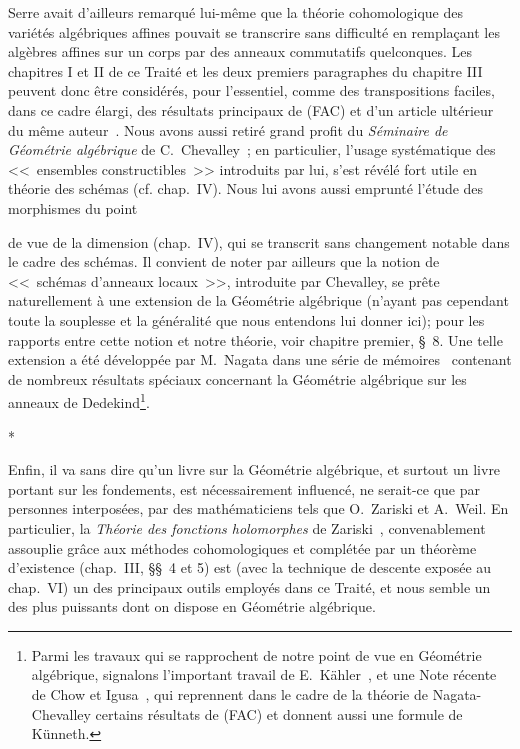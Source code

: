 Serre avait d'ailleurs remarqué lui-même que la théorie cohomologique des variétés algébriques affines pouvait se transcrire sans difficulté en remplaçant les algèbres affines sur un corps par des anneaux commutatifs quelconques.
Les chapitres I et II de ce Traité et les deux premiers paragraphes du chapitre III peuvent donc être considérés, pour l'essentiel, comme des transpositions faciles, dans ce cadre élargi, des résultats principaux de (FAC) et d'un article ultérieur du même auteur~\cite{I-15}.
Nous avons aussi retiré grand profit du \emph{Séminaire de Géométrie algébrique} de C.~Chevalley~\cite{I-1}; en particulier, l'usage systématique des <<~ensembles constructibles~>> introduits par lui, s'est révélé fort utile en théorie des schémas (cf. chap.~IV).
Nous lui avons aussi emprunté l'étude des morphismes du point

de vue de la dimension (chap.~IV), qui se transcrit sans changement notable dans le cadre des schémas.
Il convient de noter par ailleurs que la notion de <<~schémas d'anneaux locaux~>>, introduite par Chevalley, se prête naturellement à une extension de la Géométrie algébrique (n'ayant pas cependant toute la souplesse et la généralité que nous entendons lui donner ici); pour les rapports entre cette notion et notre théorie, voir chapitre premier, \S~8.
Une telle extension a été développée par M.~Nagata dans une série de mémoires~\cite{I-9} contenant de nombreux résultats spéciaux concernant la Géométrie algébrique sur les anneaux de Dedekind\footnote{Parmi les travaux qui se rapprochent de notre point de vue en Géométrie algébrique, signalons l'important travail de E.~Kähler~\cite{I-22}, et une Note récente de Chow et Igusa~\cite{I-3}, qui reprennent dans le cadre de la théorie de Nagata-Chevalley certains résultats de (FAC) et donnent aussi une formule de Künneth.}.

\bigskip
\begin{center}*\quad*\quad*\end{center}
\bigskip

Enfin, il va sans dire qu'un livre sur la Géométrie algébrique, et surtout un livre portant sur les fondements, est nécessairement influencé, ne serait-ce que par personnes interposées, par des mathématiciens tels que O.~Zariski et A.~Weil.
En particulier, la \emph{Théorie des fonctions holomorphes} de Zariski~\cite{I-20}, convenablement assouplie grâce aux méthodes cohomologiques et complétée par un théorème d'existence (chap.~III, \S\S~4 et 5) est (avec la technique de descente exposée au chap.~VI) un des principaux outils employés dans ce Traité, et nous semble un des plus puissants dont on dispose en Géométrie algébrique.

